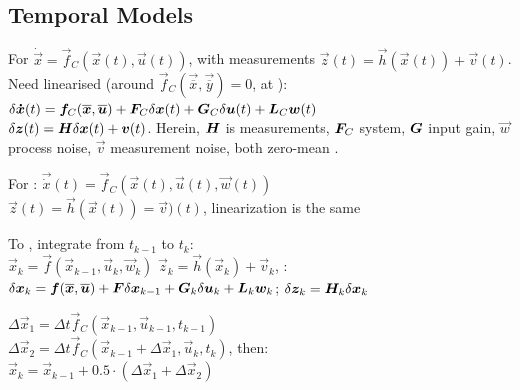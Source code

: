 \subsection{Temporal Models}
For  $\dot{\vec{x}} = \vec{f}_C(\vec{x}(t), \vec{u}(t))$, with measurements $\vec{z}(t) = \vec{h}(\vec{x}(t)) + \vec{v}(t)$.\\
Need linearised (around $\vec{f}_C(\vec{\overline{x}}, \vec{\overline{y}}) = 0$, at ):\\
$\delta \bm{\dot{x}}(t) = \bm{f}_C(\bm{\overline{x}}, \bm{\overline{u}}) + \bm{F}_C \delta \bm{x}(t) + \bm{G}_C \delta \bm{u}(t) + \bm{L}_C \bm{w}(t)$\\
$\delta \bm{z}(t) = \bm{H} \delta \bm{x}(t) + \bm{v}(t)$.
Herein, $\bm{H}$ is measurements, $\bm{F}_C$ system, $\bm{G}$ input gain, $\vec{w}$ process noise, $\vec{v}$ measurement noise, both zero-mean .

For :
$\vec{\dot{x}}(t) = \vec{f}_C(\vec{x}(t), \vec{u}(t), \vec{w}(t))$\\
$\vec{z}(t) = \vec{h}(\vec{x}(t)) = \vec{v})(t)$,
linearization is the same

To , integrate from $t_{k - 1}$ to $t_k$:\\
$\vec{x}_k = \vec{f}(\vec{x}_{k - 1}, \vec{u}_k, \vec{w}_k)$
$\vec{z}_k = \vec{h}(\vec{x}_k) + \vec{v}_k$,
:\\
$\delta \bm{x}_k = \bm{f}(\bm{\overline{x}}, \bm{\overline{u}}) + \bm{F} \delta \bm{x}_{k - 1} + \bm{G}_k \delta \bm{u}_k + \bm{L}_k \bm{w}_k$;
$\delta \bm{z}_k = \bm{H}_k \delta \bm{x}_k$

$\Delta \vec{x}_1 = \Delta t \vec{f}_C (\vec{x}_{k - 1}, \vec{u}_{k - 1}, t_{k - 1})$\\
$\Delta \vec{x}_2 = \Delta t \vec{f}_C (\vec{x}_{k - 1} + \Delta \vec{x}_1, \vec{u}_{k}, t_{k})$, then:\\
$\vec{x}_k = \vec{x}_{k - 1} + 0.5 \cdot (\Delta \vec{x}_1 + \Delta \vec{x}_2)$
